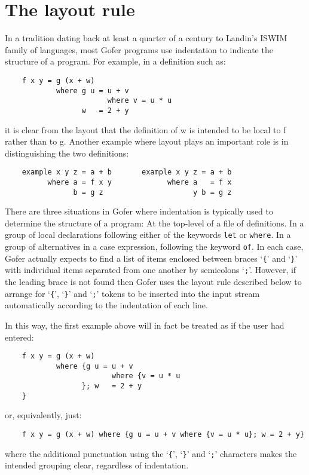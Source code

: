\section{The layout rule}
In a tradition dating back at least a quarter of a century to  Landin's
ISWIM family of languages,  most  Gofer  programs  use  indentation  to
indicate the structure of a program.  For example, in a definition such
as:
\begin{verbatim}
    f x y = g (x + w)
            where g u = u + v
                        where v = u * u
                  w   = 2 + y
\end{verbatim}
it is clear from the layout that the definition of w is intended to  be
local to f rather than to g.  Another example  where  layout  plays  an
important role is in distinguishing the two definitions:
\begin{verbatim}
    example x y z = a + b       example x y z = a + b
          where a = f x y             where a   = f x
                b = g z                     y b = g z
\end{verbatim}
There are three situations in Gofer where indentation is typically used
to determine the structure of a program:
\BSI
\IT  At the top-level of a file of definitions.
\IT  In a group of local declarations following either of the  keywords
     \verb"let" or \verb"where".
\IT  In a group of alternatives in a  case  expression,  following  the
     keyword \verb"of".
\ESI
In each case, Gofer actually expects to find a list of  items  enclosed
between braces `\verb"{"' and `\verb"}"' 
with individual  items  separated  from  one
another by semicolons `\verb";"'.  However, if the leading brace is not  found
then Gofer uses the layout rule described below to arrange for 
`\verb"{"', `\verb"}"'
and `\verb";"' tokens to be  inserted  into  the  input  stream  automatically
according to the indentation of each line.

In this way, the first example above will in fact be treated as if the
user had entered:
\begin{verbatim}
    f x y = g (x + w)
            where {g u = u + v
                         where {v = u * u
                  }; w   = 2 + y
    }
\end{verbatim}
or, equivalently, just:
\begin{verbatim}
    f x y = g (x + w) where {g u = u + v where {v = u * u}; w = 2 + y}
\end{verbatim}
where the additional punctuation using 
the `\verb"{"', `\verb"}"' and `\verb";"'  characters
makes the intended grouping clear, regardless of indentation.

